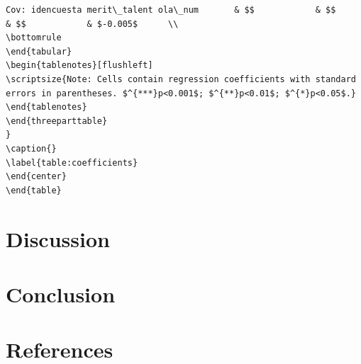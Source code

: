 \documentclass[
  12pt,
]{article}
\begin{document}
\begin{table}
{\begin{verbatim}
Cov: idencuesta merit\_talent ola\_num       & $$            & $$            & $$            & $-0.005$      \\
\bottomrule
\end{tabular}
\begin{tablenotes}[flushleft]
\scriptsize{Note: Cells contain regression coefficients with standard errors in parentheses. $^{***}p<0.001$; $^{**}p<0.01$; $^{*}p<0.05$.}
\end{tablenotes}
\end{threeparttable}
}
\caption{}
\label{table:coefficients}
\end{center}
\end{table}
\end{verbatim}

}

\end{table}%

\section{Discussion}\label{discussion}

\section{Conclusion}\label{conclusion}

\section{References}\label{references}
\end{document}
